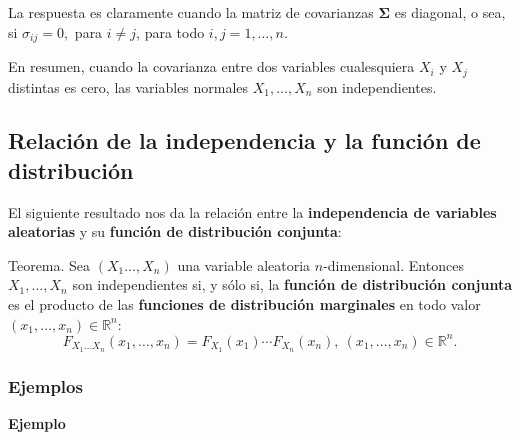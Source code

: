 \documentclass[]{book}
\begin{document}
La respuesta es claramente cuando la matriz de covarianzas \(\mathbf{\Sigma}\) es diagonal, o sea, si \(\sigma_{ij}=0,\) para \(i\neq j\), para todo \(i,j=1,\ldots,n\).

En resumen, cuando la covarianza entre dos variables cualesquiera \(X_i\) y \(X_j\) distintas es cero, las variables normales \(X_1,\ldots,X_n\) son independientes.

\hypertarget{relaciuxf3n-de-la-independencia-y-la-funciuxf3n-de-distribuciuxf3n-1}{%
\subsection{Relación de la independencia y la función de distribución}\label{relaciuxf3n-de-la-independencia-y-la-funciuxf3n-de-distribuciuxf3n-1}}

El siguiente resultado nos da la relación entre la \textbf{independencia de variables aleatorias} y su \textbf{función de distribución conjunta}:

Teorema.
Sea \((X_1\ldots,X_n)\) una variable aleatoria \(n\)-dimensional. Entonces
\(X_1,\ldots,X_n\) son independientes si, y sólo si, la \textbf{función de distribución conjunta} es el producto de las \textbf{funciones de distribución marginales} en todo valor \((x_1,\ldots,x_n)\in\mathbb{R}^n\):
\[
F_{X_1\ldots X_n}(x_1,\ldots,x_n)=F_{X_1}(x_1)\cdots F_{X_n}(x_n),\ (x_1,\ldots,x_n)\in\mathbb{R}^n.
\]

\hypertarget{ejemplos-19}{%
\subsubsection{Ejemplos}\label{ejemplos-19}}

\textbf{Ejemplo}
\end{document}
